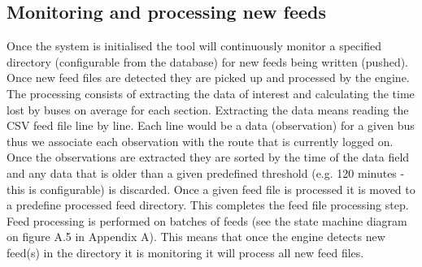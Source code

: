 \subsection{Monitoring and processing new feeds}
Once the system is initialised the tool will continuously monitor a specified directory (configurable from the database) for new feeds being written (pushed). Once new feed files are detected they are picked up and processed by the engine. The processing consists of extracting the data of interest and calculating the time lost by buses on average for each section. Extracting the data means reading the CSV feed file line by line. Each line would be a data (observation) for a given bus thus we associate each observation with the route that is currently logged on. Once the observations are extracted they are sorted by the time of the data field and any data that is older than a given predefined threshold (e.g. 120 minutes - this is configurable) is discarded. Once a given feed file is processed it is moved to a predefine processed feed directory. This completes the feed file processing step. Feed processing is performed on batches of feeds (see the state machine diagram on figure A.5 in Appendix A). This means that once the engine detects new feed(s) in the directory it is monitoring it will process all new feed files. 

